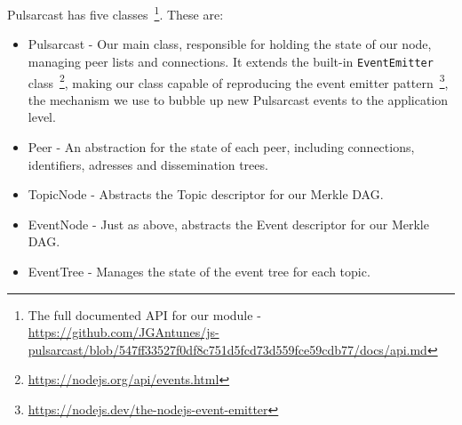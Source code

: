 Pulsarcast has five classes~\footnote{The full documented API for our module - \url{https://github.com/JGAntunes/js-pulsarcast/blob/547ff33527f0df8c751d5fcd73d559fce59cdb77/docs/api.md}}. These are:

\begin{itemize}
  \item
    Pulsarcast - Our main class, responsible for holding the state of our node, managing peer lists and connections. It extends the built-in \verb|EventEmitter| class~\footnote{\url{https://nodejs.org/api/events.html}}, making our class capable of reproducing the event emitter pattern~\footnote{\url{https://nodejs.dev/the-nodejs-event-emitter}}, the mechanism we use to bubble up new Pulsarcast events to the application level.
  \item
		Peer - An abstraction for the state of each peer, including connections, identifiers, adresses and dissemination trees.
  \item
    TopicNode - Abstracts the Topic descriptor for our Merkle DAG.
  \item
    EventNode - Just as above, abstracts the Event descriptor for our Merkle DAG.
  \item
    EventTree - Manages the state of the event tree for each topic.
\end{itemize}

